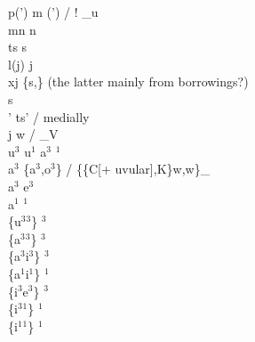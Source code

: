 \documentclass[11pt]{article}
\begin{document}
p(') m \textrightarrow\hspace{0pt} (')  / ! _u \\
mn \textrightarrow\hspace{0pt} n \\
ts \textrightarrow\hspace{0pt} s \\
l(\super j) \textrightarrow\hspace{0pt} j \\
x\super j \textrightarrow\hspace{0pt} \{s,\} (the latter mainly from borrowings?) \\
 \textrightarrow\hspace{0pt} s \\
' \textrightarrow\hspace{0pt} ts' / medially \\
j w \textrightarrow\hspace{0pt}  / _V \\
u$^3$ u$^1$ \textrightarrow\hspace{0pt} a$^3$ $^1$ \\
a$^3$ \textrightarrow\hspace{0pt} \{a$^3$,o$^3$\} / \{\{C[+ uvular],K\}\super w,w\}_ \\
a$^3$ \textrightarrow\hspace{0pt} e$^3$ \\
a$^1$ \textrightarrow\hspace{0pt} $^1$ \\
\{u$^3$\raisebox{-0.7ex}{\textasciitilde}$^3$\} \textrightarrow\hspace{0pt} $^3$ \\
\{a$^3$\raisebox{-0.7ex}{\textasciitilde}$^3$\} \textrightarrow\hspace{0pt} $^3$ \\
\{a$^3$\raisebox{-0.7ex}{\textasciitilde}i$^3$\} \textrightarrow\hspace{0pt} $^3$ \\
\{a$^1$\raisebox{-0.7ex}{\textasciitilde}i$^1$\} \textrightarrow\hspace{0pt} $^1$ \\
\{i$^3$\raisebox{-0.7ex}{\textasciitilde}e$^3$\} \textrightarrow\hspace{0pt} $^3$ \\
\{i$^3$\raisebox{-0.7ex}{\textasciitilde}$^1$\} \textrightarrow\hspace{0pt} $^1$ \\
\{i$^1$\raisebox{-0.7ex}{\textasciitilde}$^1$\} \textrightarrow\hspace{0pt} $^1$
\end{document}
